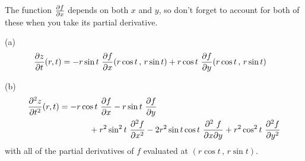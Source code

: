 \begin{hint}
The function $\pdiff{f}{x}$ depends on both $x$ and $y$, so don't forget to account for both of these when you take its partial derivative.
\end{hint}

\begin{answer}
(a) \begin{align*}
\pdiff{z}{t}(r,t) &= -r\sin t\  \pdiff{f}{x}(r\cos t\,,\,r\sin t)
                     +r\cos t\  \pdiff{f}{y}(r\cos t\,,\,r\sin t)
\end{align*}

(b)
\begin{align*}
\frac{\partial^2 z}{\partial t^2}(r,t) 
&= -r\cos t \  \pdiff{f}{x}
   -r\sin t \  \pdiff{f}{y} \\
&\hskip0.5in
  +r^2\sin^2 t\ \frac{\partial^2 f}{\partial x^2}
  -2r^2\sin t\cos t\ 
       \frac{\partial^2\ f}{\partial x\partial y}
  +r^2\cos^2 t\ \frac{\partial^2 f}{\partial y^2}
\end{align*}
with all of the partial derivatives of $f$ evaluated at 
$(r\cos t\,,\,r\sin t)$.
\end{answer}

